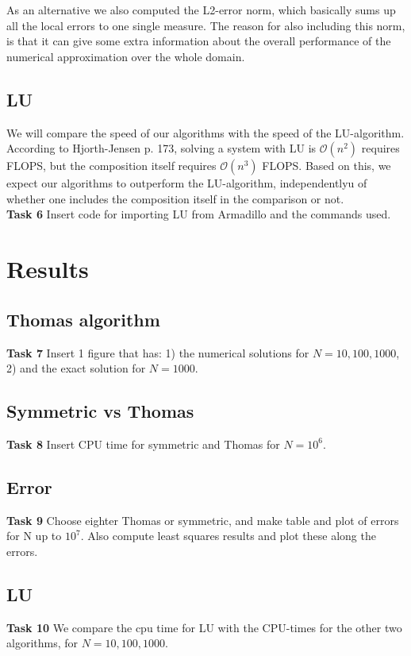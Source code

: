 \documentclass{article}
\begin{document}
As an alternative we also computed the L2-error norm, which basically sums up all the local errors to one single measure. The reason for also including this norm, is that it can give some extra information about the overall performance of the numerical approximation over the whole domain.

\subsection{LU}
We will compare the speed of our algorithms with the speed of the LU-algorithm. According to Hjorth-Jensen \cite{MHJ} p. 173, solving a system with LU is $\mathcal{O}(n^2)$ requires FLOPS, but the composition itself requires  $\mathcal{O}(n^3)$ FLOPS. Based on this, we expect our algorithms to outperform the LU-algorithm, independentlyu of whether one includes the composition itself in the comparison or not.\\

\textbf{Task 6} Insert code for importing LU from Armadillo and the commands used.

\section{Results}

\subsection{Thomas algorithm}
\textbf{Task 7} Insert 1 figure that has: 1) the numerical solutions for $N=10,100,1000$, 2) and the exact solution for $N=1000$.

\subsection{Symmetric vs Thomas}
\textbf{Task 8} Insert CPU time for symmetric and Thomas for $N=10^6$.

\subsection{Error}
\textbf{Task 9} Choose eighter Thomas or symmetric, and make table and plot of errors for N up to $10^7$. Also compute least squares results and plot these along the errors.

\subsection{LU}
\textbf{Task 10} We compare the cpu time for LU with the CPU-times for the other two algorithms, for $N=10, 100, 1000$. \\
\end{document}

